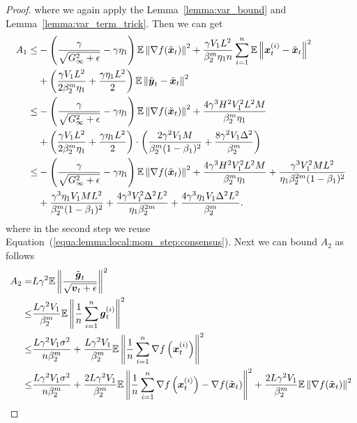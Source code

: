 \begin{proof}
where we again apply the Lemma~\ref{lemma:var_bound} and Lemma~\ref{lemma:var_term_trick}.
Then we can get
\begin{align*}
    A_1 \leq & -\left( \frac{\gamma}{\sqrt{G_\infty^2+\epsilon}} - \gamma\eta_1 \right)\mathbb E\left\| \nabla f(\tilde{\boldsymbol{x}}_t) \right\|^2
    + \frac{\gamma V_1L^2}{\beta_2^m\eta_1n}\sum_{i=1}^{n}\mathbb{E}\left\| \boldsymbol{x}_t^{(i)} - \tilde{\boldsymbol{x}}_t \right\|^2 \\
    & + \left(\frac{\gamma V_1L^2}{2\beta_2^m\eta_1} + \frac{\gamma\eta_1L^2}{2}\right)\mathbb{E}\left\| \tilde{\boldsymbol{y}}_t - \tilde{\boldsymbol{x}}_t \right\|^2 \\
\leq & -\left( \frac{\gamma}{\sqrt{G_\infty^2+\epsilon}} - \gamma\eta_1 \right)\mathbb E\left\| \nabla f(\tilde{\boldsymbol{x}}_t) \right\|^2
    + \frac{4\gamma^3H^2V_1^2L^2M}{\beta_2^m\eta_1} \\
    & + \left(\frac{\gamma V_1L^2}{2\beta_2^m\eta_1} + \frac{\gamma\eta_1L^2}{2}\right)\cdot \left( \frac{2\gamma^2V_1M}{\beta_2^m(1-\beta_1)^2} + \frac{8\gamma^2V_1\Delta^2}{\beta_2^m}\right) \\
\leq & -\left( \frac{\gamma}{\sqrt{G_\infty^2+\epsilon}} - \gamma\eta_1 \right)\mathbb E\left\| \nabla f(\tilde{\boldsymbol{x}}_t) \right\|^2
    + \frac{4\gamma^3H^2V_1^2L^2M}{\beta_2^m\eta_1} + \frac{\gamma^3V_1^2ML^2}{\eta_1\beta_2^{2m}(1-\beta_1)^2} \\
    & + \frac{\gamma^3\eta_1V_1ML^2}{\beta_2^m(1-\beta_1)^2} + \frac{4\gamma^3V_1^2\Delta^2L^2}{\eta_1\beta_2^{2m}} + \frac{4\gamma^3\eta_1V_1\Delta^2L^2}{\beta_2^m}.
\end{align*}
where in the second step we reuse Equation~(\ref{equa:lemma:local:mom_step:consensus}).
Next we can bound $A_2$ as follows
\begin{align*}
    A_2 = & L\gamma^2\mathbb E\left\| \frac{\tilde{\*{g}}_{t}}{\sqrt{\*v_t+\epsilon}}\right\|^2 \\
\leq  & \frac{L\gamma^2V_1}{\beta_2^m}\mathbb E\left\| \frac{1}{n}\sum_{i=1}^{n}\*{g}_{t}^{(i)}\right\|^2 \\
    \leq & \frac{L\gamma^2V_1\sigma^2}{n\beta_2^m} + \frac{L\gamma^2V_1}{\beta_2^m}\mathbb E\left\| \frac{1}{n}\sum_{i=1}^{n}\nabla f\left( \*x_t^{(i)} \right)\right\|^2 \\
\leq & \frac{L\gamma^2V_1\sigma^2}{n\beta_2^m} + \frac{2L\gamma^2V_1}{\beta_2^m}\mathbb E\left\| \frac{1}{n}\sum_{i=1}^{n}\nabla f\left( \*x_t^{(i)} \right) - \nabla f(\tilde{\*x}_t)\right\|^2 + \frac{2L\gamma^2V_1}{\beta_2^m}\mathbb E\left\| \nabla f(\tilde{\*x}_t)\right\|^2 \\

\end{align*}
\end{proof}
